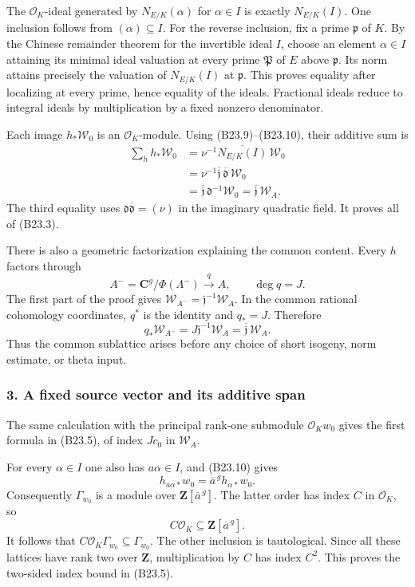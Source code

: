 \documentclass[11pt,a4paper]{article}
\theoremstyle{definition}
\begin{document}
The \(\mathcal O_K\)-ideal generated by \(N_{E/K}(\alpha)\) for \(\alpha\in I\) is exactly \(N_{E/K}(I)\). One inclusion follows from \((\alpha)\subseteq I\). For the reverse inclusion, fix a prime \(\mathfrak p\) of \(K\). By the Chinese remainder theorem for the invertible ideal \(I\), choose an element \(\alpha\in I\) attaining its minimal ideal valuation at every prime \(\mathfrak P\) of \(E\) above \(\mathfrak p\). Its norm attains precisely the valuation of \(N_{E/K}(I)\) at \(\mathfrak p\). This proves equality after localizing at every prime, hence equality of the ideals. Fractional ideals reduce to integral ideals by multiplication by a fixed nonzero denominator.

Each image \(h_*\mathscr W_0\) is an \(\mathcal O_K\)-module. Using (B23.9)--(B23.10), their additive sum is \[
 \begin{aligned}
 \sum_hh_*\mathscr W_0
 &=\nu^{-1}\overline{N_{E/K}(I)}\,\mathscr W_0\\
 &=\nu^{-1}\overline{\mathfrak j}\,\overline{\mathfrak d}\,\mathscr W_0\\
 &=\overline{\mathfrak j}\,\mathfrak d^{-1}\mathscr W_0
 =\overline{\mathfrak j}\,\mathscr W_A.
 \end{aligned}
\tag{B23.11}
\] The third equality uses \(\mathfrak d\overline{\mathfrak d}=(\nu)\) in the imaginary quadratic field. It proves all of (B23.3).

There is also a geometric factorization explaining the common content. Every \(h\) factors through \[
 A^-=\mathbf C^g/\Phi(\Lambda^-)
 \xrightarrow{q}A,
 \qquad\deg q=J.
\] The first part of the proof gives \(\mathscr W_{A^-}=\mathfrak j^{-1}\mathscr W_A\). In the common rational cohomology coordinates, \(q^*\) is the identity and \(q_*=J\). Therefore \[
 q_*\mathscr W_{A^-}=J\mathfrak j^{-1}\mathscr W_A
 =\overline{\mathfrak j}\,\mathscr W_A.
\tag{B23.12}
\] Thus the common sublattice arises before any choice of short isogeny, norm estimate, or theta input.

\subsubsection{3. A fixed source vector and its additive span}\label{a-fixed-source-vector-and-its-additive-span}

The same calculation with the principal rank-one submodule \(\mathcal O_Kw_0\) gives the first formula in (B23.5), of index \(Jc_0\) in \(\mathscr W_A\).

For every \(\alpha\in I\) one also has \(a\alpha\in I\), and (B23.10) gives \[
 h_{a\alpha*}w_0=\overline a^{\,g}h_{\alpha*}w_0.
\] Consequently \(\Gamma_{w_0}\) is a module over \(\mathbf Z[\overline a^{\,g}]\). The latter order has index \(C\) in \(\mathcal O_K\), so \[
 C\mathcal O_K\subseteq\mathbf Z[\overline a^{\,g}].
\] It follows that \(C\mathcal O_K\Gamma_{w_0}\subseteq\Gamma_{w_0}\). The other inclusion is tautological. Since all these lattices have rank two over \(\mathbf Z\), multiplication by \(C\) has index \(C^2\). This proves the two-sided index bound in (B23.5).
\end{document}
